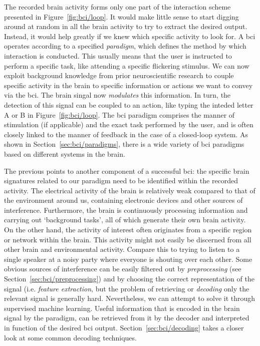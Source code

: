 The recorded brain activity forms only one part of the interaction scheme presented
in Figure~\ref{fig:bci/loop}.
It would make little sense to start digging around at random in all the brain
activity to try to extract the desired output.
Instead, it would help greatly if we knew which specific activity to look for.
A \ac{bci} operates according to a specified \emph{paradigm}, which defines the
method by which interaction is conducted.
This usually means that the user is instructed to perform a specific task, like
attending a specific flickering stimulus.
We can now exploit background knowledge from prior neuroscientific research
to couple specific activity in the brain to specific information or actions we
want to convey via the \ac{bci}.
The brain singal now \emph{modulates} this information.
In turn, the detection of this signal can be coupled to an action, like
typing the inteded letter A or B in Figure~\ref{fig:bci/loop}.
The \ac{bci} paradigm comprises the manner of stimulation (if applicable) and the
exact task performed by the user, and is often closely linked to the manner of
feedback in the case of a closed-loop system.
As shown in Section~\ref{sec:bci/paradigms}, there is a wide variety of \ac{bci}
paradigms based on different systems in the brain.

The previous points to another component of a successful \ac{bci}: the specific
brain signatures related to our paradigm need to be identified within the recorded
activity.
The electrical activity of the brain is relatively weak compared to that of the
environment around us, containing electronic devices and other sources of
interference.
Furthermore, the brain is continuously processing information and carrying out
`background tasks', all of which generate their own brain activity.
On the other hand, the activity of interest often
originates from a specific region or network within the brain.
This activity might not easily be discerned from all other brain and
environmental activity.
Compare this to trying to listen to a single speaker at a noisy party where
everyone is shouting over each other.
Some obvious sources of interference can be easily filtered out by
\emph{preprocessing} (see Section~\ref{sec:bci/preprocessing}) and by choosing
the correct representation of the signal (i.e. \emph{feature extraction}, but the problem
of retrieving or \emph{decoding} only the relevant signal is generally hard.
Nevertheless, we can attempt to solve it through supervised machine learning.
Useful information that is encoded in the brain signal by the paradigm,
can be retrieved from it by the decoder and interpreted in function of the
desired \ac{bci} output.
Section~\ref{sec:bci/decoding} takes a closer look at some common decoding
techniques.

